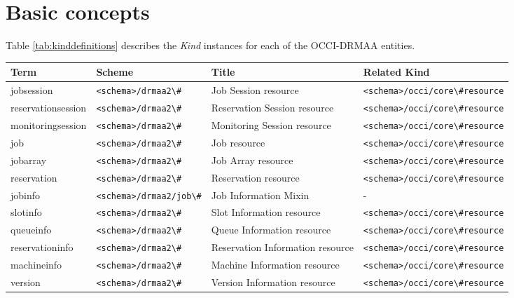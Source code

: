 \documentclass[10pt]{article}
\newcommand{\h}[1]{\lstinline|#1|}
\begin{document}

\section{Basic concepts}

Table \ref{tab:kinddefinitions} describes the \emph{Kind} instances for each of the OCCI-DRMAA entities.

\begin{table}[ht]
\centering
\begin{tabularx}{\textwidth}{|l|l|X|l|}
\hline
Term & Scheme & Title & Related Kind \\
\hline
jobsession             & \h{<schema>/drmaa2\#}             & Job Session resource            & \h{<schema>/occi/core\#resource} \\
reservationsession     & \h{<schema>/drmaa2\#}             & Reservation Session resource    & \h{<schema>/occi/core\#resource} \\
monitoringsession      & \h{<schema>/drmaa2\#}             & Monitoring Session resource     & \h{<schema>/occi/core\#resource} \\
job                    & \h{<schema>/drmaa2\#}             & Job resource                    & \h{<schema>/occi/core\#resource} \\
jobarray               & \h{<schema>/drmaa2\#}             & Job Array resource              & \h{<schema>/occi/core\#resource} \\
reservation            & \h{<schema>/drmaa2\#}             & Reservation resource            & \h{<schema>/occi/core\#resource} \\
jobinfo                & \h{<schema>/drmaa2/job\#}         & Job Information Mixin           & - \\
slotinfo               & \h{<schema>/drmaa2\#}             & Slot Information resource       & \h{<schema>/occi/core\#resource} \\
queueinfo              & \h{<schema>/drmaa2\#}             & Queue Information resource      & \h{<schema>/occi/core\#resource} \\
reservationinfo        & \h{<schema>/drmaa2\#}             & Reservation Information resource & \h{<schema>/occi/core\#resource} \\
machineinfo            & \h{<schema>/drmaa2\#}             & Machine Information resource    & \h{<schema>/occi/core\#resource} \\
version                & \h{<schema>/drmaa2\#}             & Version Information resource    & \h{<schema>/occi/core\#resource} \\

\end{tabularx}
\end{table}
\end{document}
